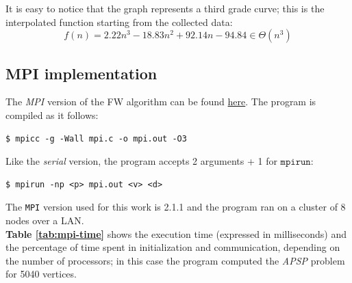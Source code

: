 It is easy to notice that the graph represents a 
third grade curve; this is the interpolated function starting from the collected data:
\[f(n) = 2.22n^3 - 18.83n^2 + 92.14n -94.84 \in \Theta(n^3) \]



\subsection{MPI implementation}

The \emph{MPI} version of the FW algorithm can be found \href{https://github.com/firaja/Parallel-FloydWarshall/blob/master/mpi.c}{here}. 
The program is compiled as it follows:

\begin{lstlisting}[basicstyle=\footnotesize\ttfamily]
$ mpicc -g -Wall mpi.c -o mpi.out -O3
\end{lstlisting}
Like the \emph{serial} version, the program accepts 2 arguments + 1 for $\texttt{mpirun}$:
\begin{lstlisting}[basicstyle=\footnotesize\ttfamily]
$ mpirun -np <p> mpi.out <v> <d>
\end{lstlisting}
The \texttt{MPI} version used for this work is 2.1.1 and the program ran on a cluster of 8 nodes over a LAN. \\
\textbf{Table \ref*{tab:mpi-time}} shows the execution time (expressed in milliseconds) and the percentage of time spent in initialization and communication, depending on the number of processors; 
in this case the program computed the \emph{APSP} problem for 5040 vertices.

